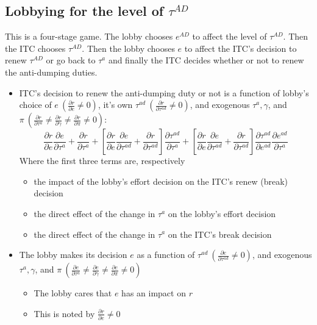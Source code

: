 \documentclass[12pt]{article}
\newcommand{\ga}{\gamma}
\begin{document}
\subsection{Lobbying for the level of $\tau^{AD}$}
This is a four-stage game. The lobby chooses $e^{AD}$ to affect the level of $\tau^{AD}$. Then the ITC chooses $\tau^{AD}$. Then the lobby chooses $e$ to affect the ITC's decision to renew $\tau^{AD}$ or go back to $\tau^a$ and finally the ITC decides whether or not to renew the anti-dumping duties.
\begin{itemize}
	\item ITC's decision to renew the anti-dumping duty or not is a function of lobby's choice of $e \ \left(\frac{\partial r}{\partial e} \neq 0\right)$, it's own $\tau^{ad} \ \left(\frac{\partial r}{\partial \tau^{ad}} \neq 0\right)$, and exogenous $\tau^a, \ga$, and $\pi \ \left(\frac{\partial r}{\partial \tau^a} \neq \frac{\partial r}{\partial \ga} \neq \frac{\partial r}{\partial \pi} \neq  0\right)$:
		\[
		  \frac{\partial r}{\partial e} \frac{\partial e}{\partial \tau^a} + \frac{\partial r}{\partial \tau^a} + \left[ \frac{\partial r}{\partial e} \frac{\partial e}{\partial \tau^{ad}} + \frac{\partial r}{\partial \tau^{ad}}\right] \frac{\partial \tau^{ad}}{\partial \tau^a} + \left[ \frac{\partial r}{\partial e} \frac{\partial e}{\partial \tau^{ad}} + \frac{\partial r}{\partial \tau^{ad}}\right] \frac{\partial \tau^{ad}}{\partial e^{ad}} \frac{\partial e^{ad}}{\partial \tau^a}
		\]
		Where the first three terms are, respectively
			\begin{itemize}
				\item the impact of the lobby's effort decision on the ITC's renew (break) decision
				\item the direct effect of the change in $\tau^a$ on the lobby's effort decision
				\item the direct effect of the change in $\tau^a$ on the ITC's break decision
			\end{itemize}
	\item The lobby makes its decision $e$ as a function of $\tau^{ad} \ \left(\frac{\partial e}{\partial \tau^{ad}} \neq 0\right)$, and exogenous $\tau^a, \ga$, and $\pi \ \left(\frac{\partial e}{\partial \tau^a} \neq \frac{\partial e}{\partial \ga} \neq \frac{\partial e}{\partial \pi} \neq  0\right)$
		\begin{itemize}
			\item The lobby cares that $e$ has an impact on $r$
			\item This is noted by $\frac{\partial r}{\partial e} \neq 0$

\end{itemize}
\end{itemize}
\end{document}
